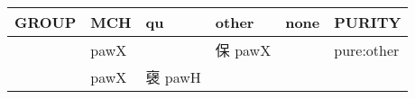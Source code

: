 \documentclass[14pt,a4paper]{scrartcl}
\begin{document}
\begin{longtable}[c]{@{}llllll@{}}
\toprule
\begin{minipage}[b]{0.14\columnwidth}\raggedright\strut
GROUP
\strut\end{minipage} &
\begin{minipage}[b]{0.14\columnwidth}\raggedright\strut
MCH
\strut\end{minipage} &
\begin{minipage}[b]{0.14\columnwidth}\raggedright\strut
qu
\strut\end{minipage} &
\begin{minipage}[b]{0.14\columnwidth}\raggedright\strut
other
\strut\end{minipage} &
\begin{minipage}[b]{0.14\columnwidth}\raggedright\strut
none
\strut\end{minipage} &
\begin{minipage}[b]{0.14\columnwidth}\raggedright\strut
PURITY
\strut\end{minipage}\tabularnewline
\midrule
\endhead
\begin{minipage}[t]{0.14\columnwidth}\raggedright\strut
𤓽
\strut\end{minipage} &
\begin{minipage}[t]{0.14\columnwidth}\raggedright\strut
pawX
\strut\end{minipage} &
\begin{minipage}[t]{0.14\columnwidth}\raggedright\strut
\strut\end{minipage} &
\begin{minipage}[t]{0.14\columnwidth}\raggedright\strut
保 pawX
\strut\end{minipage} &
\begin{minipage}[t]{0.14\columnwidth}\raggedright\strut
\strut\end{minipage} &
\begin{minipage}[t]{0.14\columnwidth}\raggedright\strut
pure:other
\strut\end{minipage}\tabularnewline
\begin{minipage}[t]{0.14\columnwidth}\raggedright\strut
𠊻
\strut\end{minipage} &
\begin{minipage}[t]{0.14\columnwidth}\raggedright\strut
pawX
\strut\end{minipage} &
\begin{minipage}[t]{0.14\columnwidth}\raggedright\strut
襃 pawH
\strut\end{minipage} &
\begin{minipage}[t]{0.14\columnwidth}\raggedright\strut

\end{minipage}
\end{longtable}
\end{document}
